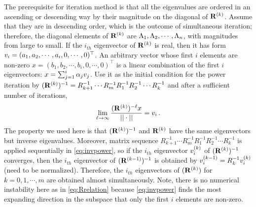 \documentclass[final,leqno,onefignum,onetabnum]{siamltexmm}
\begin{document}
The prerequisite for iteration method is that all the eigenvalues are
ordered in an ascending or descending way by their magnitude on the
diagonal of $\mathbf{R}^{(k)}$. Assume that they are in descending order, which
is the outcome of simultaneous iteration; therefore, the diagonal elements
of $\mathbf{R}^{(k)}$ are $\Lambda_{1},\Lambda_{2},\cdots,\Lambda_{n}$, with
magnitudes from large to small.
If the $i_{th}$ eigenvector of $\mathbf{R}^{(k)}$ is real, then it has form
$v_{i}=(a_{1},a_{2},\allowbreak \cdots,a_{i},0,\cdots, 0)^\top $. An arbitrary
vector whose first $i$ elements are non-zero
$x=(b_{1},b_{2},\cdots,b_{i},0, \allowbreak \cdots, 0)^\top $ is a linear combination
of the first $i$ eigenvectors: $x=\sum_{j=1}^{i}\alpha_{j}v_{j}$.
Use it as the initial condition for the power iteration by
$(\mathbf{R}^{(k)})^{-1}=R_{k+1}^{-1}\cdots R_{m}^{-1}R_{1}^{-1}R_{2}^{-1}\cdots
R_{k}^{-1}$ and after a sufficient number of iterations,
\begin{equation}
  \label{eq:invpower}
  \lim_{\ell\to \infty} \frac{(\ps{R}{k})^{-\ell}x}{||\cdot||}=\Rve{i}
  \,.
\end{equation}
The property we used here is that $(\mathbf{R}^{(k)})^{-1}$ and $\mathbf{R}^{(k)}$ have
the same eigenvectors but inverse eigenvalues.
{Moreover, matrix
sequence $R_{k+1}^{-1}\cdots R_{m}^{-1}R_{1}^{-1}R_{2}^{-1}\cdots R_{k}^{-1}$
is applied sequentially in \eqref{eq:invpower},
so if the $i_{th}$ eigenvector $v_{i}^{(k)}$
of $(\mathbf{R}^{(k)})^{-1}$ converges,
then the $i_{th}$ eigenvector of $(\mathbf{R}^{(k-1)})^{-1}$ is
obtained by $v_{i}^{(k-1)}=R^{-1}_kv_{i}^{(k)}$ (need to be normalized).
Therefore, the $i_{th}$ eigenvectors
of $(\mathbf{R}^{(k)})$ for $k=0, 1, \cdots, m$ are obtained almost
simultaneously. Note, there is no numerical instability here as in
\eqref{eq:Rrelation} because \eqref{eq:invpower} finds the
most expanding direction in the subspace that only the first
$i$ elements are non-zero}.
\end{document}
